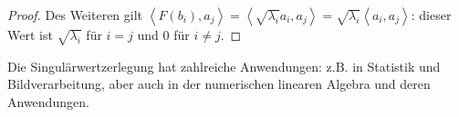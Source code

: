 \documentclass[
a4paper,landscape,16pt,
bibliography=totocnumbered,
numbers=noenddot,
]{scrartcl}
\numberwithin{equation}{subsection}
\newcommand{\scalar}[1]{\left\langle #1 \right\rangle}
\theoremstyle{plain}
\theoremstyle{definition}
\begin{document}
\begin{proof}
 	Des Weiteren gilt $\scalar{ F(b_i) , a_j}  = \scalar{ \sqrt{\lambda_i} a_i, a_j} = \sqrt{\lambda_i} \scalar{ a_i, a_j}$: dieser Wert ist $\sqrt{\lambda_i}$ für $i=j$ und $0$ für $i \ne j$. 
\end{proof} 


Die Singulärwertzerlegung hat zahlreiche Anwendungen: z.B. in Statistik und Bildverarbeitung, aber auch in der numerischen linearen Algebra und deren Anwendungen. 
\end{document}
